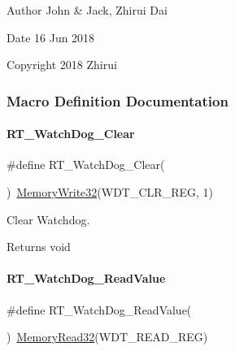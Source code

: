 \begin{DoxyAuthor}{Author}
John \& Jack, Zhirui Dai 
\end{DoxyAuthor}
\begin{DoxyDate}{Date}
16 Jun 2018 
\end{DoxyDate}
\begin{DoxyCopyright}{Copyright}
2018 Zhirui 
\end{DoxyCopyright}


\subsubsection{Macro Definition Documentation}
\mbox{\label{a00059_ae976b2fe76d4b216e68a771068434abc}} 
\paragraph{\texorpdfstring{R\+T\+\_\+\+Watch\+Dog\+\_\+\+Clear}{RT\_WatchDog\_Clear}}
{\footnotesize\ttfamily \#define R\+T\+\_\+\+Watch\+Dog\+\_\+\+Clear(\begin{DoxyParamCaption}{ }\end{DoxyParamCaption})~\mbox{\hyperlink{a00020_a6b9732365b12e48ddb89fe1028b975b0}{Memory\+Write32}}(W\+D\+T\+\_\+\+C\+L\+R\+\_\+\+R\+EG, 1)}



Clear Watchdog. 

\begin{DoxyReturn}{Returns}
void 
\end{DoxyReturn}
\mbox{\label{a00059_acdfc8b8f0bddfd7382d49a22a92a5930}} 
\paragraph{\texorpdfstring{R\+T\+\_\+\+Watch\+Dog\+\_\+\+Read\+Value}{RT\_WatchDog\_ReadValue}}
{\footnotesize\ttfamily \#define R\+T\+\_\+\+Watch\+Dog\+\_\+\+Read\+Value(\begin{DoxyParamCaption}{ }\end{DoxyParamCaption})~\mbox{\hyperlink{a00020_a2d484dc15bdf30ee11ab3b05f31f0e16}{Memory\+Read32}}(W\+D\+T\+\_\+\+R\+E\+A\+D\+\_\+\+R\+EG)}



